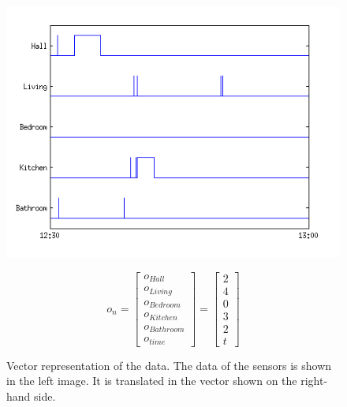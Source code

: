 \begin{figure}[h]
\centering
\begin{minipage}{0.55\linewidth}
\centering
\includegraphics[width=\textwidth]{Pictures/FeatExample.png}
\label{fig:FeatEx}
\end{minipage}
\begin{minipage}{0.35\linewidth}
\centering
\begin{equation*}
o_n = 
 \begin{bmatrix} 
 o_{Hall}\\
 o_{Living}\\
 o_{Bedroom}\\
 o_{Kitchen}\\
 o_{Bathroom}\\
 o_{time}
 \end{bmatrix}
 =
  \begin{bmatrix} 
 2\\
 4\\
 0\\
 3\\
 2\\
 t
 \end{bmatrix}
\end{equation*}
\end{minipage}
\caption{Vector representation of the data. The data of the sensors is shown in the left image. It is translated in the vector shown on the right-hand side.}
\end{figure}

